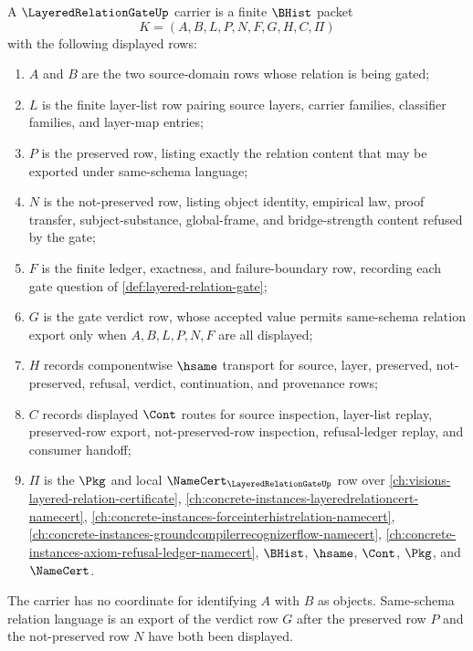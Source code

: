 \begin{definition}
\label{def:layered-relation-gate-carrier}
A $\LayeredRelationGateUp$ carrier is a finite $\BHist$ packet
$$
K=(A,B,L,P,N,F,G,H,C,\Pi)
$$
with the following displayed rows:
\begin{enumerate}
\item $A$ and $B$ are the two source-domain rows whose relation is being gated;
\item $L$ is the finite layer-list row pairing source layers, carrier families, classifier families, and layer-map entries;
\item $P$ is the preserved row, listing exactly the relation content that may be exported under same-schema language;
\item $N$ is the not-preserved row, listing object identity, empirical law, proof transfer, subject-substance, global-frame, and bridge-strength content refused by the gate;
\item $F$ is the finite ledger, exactness, and failure-boundary row, recording each gate question of \autoref{def:layered-relation-gate};
\item $G$ is the gate verdict row, whose accepted value permits same-schema relation export only when $A,B,L,P,N,F$ are all displayed;
\item $H$ records componentwise $\hsame$ transport for source, layer, preserved, not-preserved, refusal, verdict, continuation, and provenance rows;
\item $C$ records displayed $\Cont$ routes for source inspection, layer-list replay, preserved-row export, not-preserved-row inspection, refusal-ledger replay, and consumer handoff;
\item $\Pi$ is the $\Pkg$ and local $\NameCert_{\LayeredRelationGateUp}$ row over \autoref{ch:visions-layered-relation-certificate}, \autoref{ch:concrete-instances-layeredrelationcert-namecert}, \autoref{ch:concrete-instances-forceinterhistrelation-namecert}, \autoref{ch:concrete-instances-groundcompilerrecognizerflow-namecert}, \autoref{ch:concrete-instances-axiom-refusal-ledger-namecert}, $\BHist$, $\hsame$, $\Cont$, $\Pkg$, and $\NameCert$.
\end{enumerate}
The carrier has no coordinate for identifying $A$ with $B$ as objects. Same-schema relation language is an export of the verdict row $G$ after the preserved row $P$ and the not-preserved row $N$ have both been displayed.
\end{definition}

